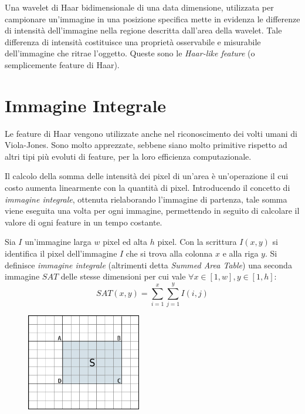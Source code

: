 Una wavelet di Haar bidimensionale di una data dimensione, utilizzata per campionare un'immagine in una posizione specifica mette in evidenza le differenze di intensità dell'immagine nella regione descritta dall'area della wavelet. Tale differenza di intensità costituisce una proprietà osservabile e misurabile dell'immagine che ritrae l'oggetto. Queste sono le \emph{Haar-like feature} (o semplicemente feature di Haar).

\section{Immagine Integrale}
\label{sec:integral_image}
Le feature di Haar vengono utilizzate anche nel riconoscimento dei volti umani di Viola-Jones.
Sono molto apprezzate, sebbene siano molto primitive rispetto ad altri tipi più evoluti di feature, per la loro efficienza computazionale.

Il calcolo della somma delle intensità dei pixel di un'area è un'operazione il cui costo aumenta linearmente con la quantità di pixel. Introducendo il concetto di \emph{immagine integrale}, ottenuta rielaborando l'immagine di partenza, tale somma viene eseguita una volta per ogni immagine, permettendo in seguito di calcolare il valore di ogni feature in un tempo costante.

\begin{definition}
    Sia $I$ un'immagine larga $w$ pixel ed alta $h$ pixel. Con la scrittura $I(x, y)$ si identifica il pixel dell'immagine $I$ che si trova alla colonna $x$ e alla riga $y$.
    Si definisce \emph{immagine integrale} (altrimenti detta \emph{Summed Area Table}) una seconda immagine $SAT$ delle stesse dimensioni per cui vale $\forall x \in [1,w], y \in [1,h]$:
    \begin{equation}
        SAT(x, y) = \sum_{i = 1}^{x} \sum_{j = 1}^{y} I(i, j)
    \end{equation}
\end{definition}

\begin{figure}
    \centering
    \includegraphics[width=5cm]{img/integral_image_sum.png}
    \caption{}
    \label{fig:integral_image_sum}
\end{figure}

